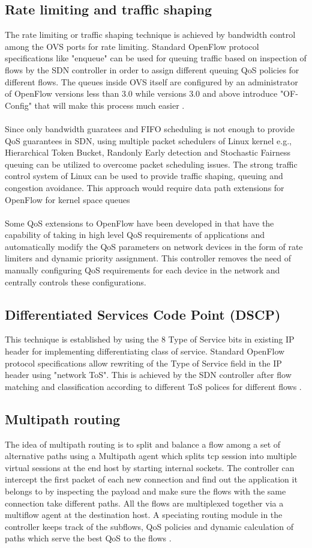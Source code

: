 \documentclass[paper=a4, fontsize=11pt]{scrartcl}	%
\numberwithin{equation}{section}		%
\numberwithin{figure}{section}			%
\numberwithin{table}{section}				%
\begin{document}
\subsection{Rate limiting and traffic shaping}
The rate limiting or traffic shaping technique is achieved by bandwidth control among the OVS ports for rate limiting. Standard OpenFlow protocol specifications like "enqueue" can be used for queuing traffic based on inspection of flows by the SDN controller in order to assign different queuing QoS policies for different flows. The queues inside OVS itself are configured by an administrator of OpenFlow versions less than 3.0 while versions 3.0 and above introduce "OF-Config" that will make this process much easier \cite{bigswitch}. 
\\
\\
Since only bandwidth guaratees and FIFO scheduling is not enough to provide QoS guarantees in SDN, using multiple packet schedulers of Linux kernel e.g., Hierarchical Token Bucket, Randonly Early detection and Stochastic Fairness queuing can be utilized to overcome packet scheduling issues. The strong traffic control system of Linux can be used to provide traffic shaping, queuing and congestion avoidance. This approach would require data path extensions for OpenFlow for kernel space queues \cite{scheduler}
\\
\\
Some QoS extensions to OpenFlow have been developed in \cite{convergence} that have the capability of taking in high level QoS requirements of applications and automatically modify the QoS parameters on network devices in the form of rate limiters and dynamic priority assignment. This controller removes the need of manually configuring QoS requirements for each device in the network and centrally controls these configurations. 
\subsection{Differentiated Services Code Point (DSCP)}
This technique is established by using the 8 Type of Service bits in existing IP header for implementing differentiating class of service. Standard OpenFlow protocol specifications allow rewriting of the Type of Service field in the IP header using "network ToS". This is achieved by the SDN controller after flow matching and classification according to different ToS polices for different flows \cite{bigswitch}.
\subsection{Multipath routing}
The idea of multipath routing is to split and balance a flow among a set of alternative paths using a Multipath agent which splits tcp session into multiple virtual sessions at the end host by starting internal sockets. The controller can intercept the first packet of each new connection and find out the application it belongs to by inspecting the payload and make sure the flows with the same connection take different paths. All the flows are multiplexed together via a multiflow agent at the destination host. A speciating routing module in the controller keeps track of the subflows, QoS policies and dynamic calculation of paths which serve the best QoS to the flows \cite{multipath}.
\end{document}

